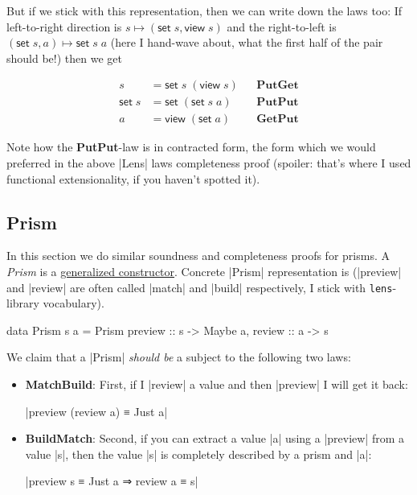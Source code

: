 \documentclass{article}
\begin{document}
But if we stick with this representation, then we can write down the laws too:
If left-to-right direction is $s \mapsto (\mathsf{set}\;s, \mathsf{view}\;s)$ and
the right-to-left is $(\mathsf{set}\;s, a) \mapsto \mathsf{set}\;s\;a$
(here I hand-wave about, what the first half of the pair should be!) then we get

\begin{equation}
\begin{aligned}
    s &= \mathsf{set}\;s\;(\mathsf{view}\;s)               && \textbf{PutGet} \\
    \mathsf{set}\;s &= \mathsf{set}\;(\mathsf{set}\;s\;a)  && \textbf{PutPut} \\
    a &= \mathsf{view}\;(\mathsf{set}\;a)                  && \textbf{GetPut}
\end{aligned}
\end{equation}

Note how the \textbf{PutPut}-law is in contracted form, the form
which we would preferred in the above |Lens| laws completeness proof
(spoiler: that's where I used functional extensionality, if you haven't spotted it).

\subsection{Prism}

In this section we do similar soundness and completeness proofs for prisms.
A \emph{Prism} is a \href{2018-06-19-prisms-are-constructors.html}{generalized constructor}.
Concrete |Prism| representation is
(|preview| and |review| are often called |match| and |build| respectively, I stick with \texttt{lens}-library vocabulary).

\begin{code}
data Prism s a = Prism { preview :: s -> Maybe a, review :: a -> s }
\end{code}

We claim that a |Prism| \emph{should be} a subject to the following two laws:

\begin{itemize}
\item \textbf{MatchBuild}: First, if I |review| a value and then |preview| I will get it back:

    |preview (review a) ≡ Just a|

\item \textbf{BuildMatch}: Second, if you can extract a value |a| using a |preview| from a value |s|, then the value |s| is completely described by a prism and |a|:

    |preview s ≡ Just a ⇒ review a ≡ s|
\end{itemize}
\end{document}

